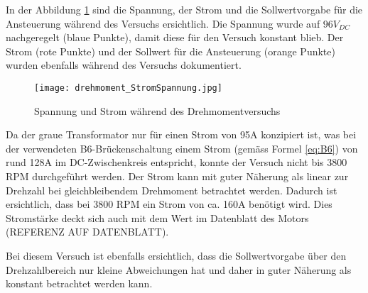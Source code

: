 In der Abbildung \ref{fig:drehmoment/StromSpannung} sind die Spannung, der Strom und die Sollwertvorgabe für die Ansteuerung während des Versuchs ersichtlich. Die Spannung wurde auf $96V_{DC}$ nachgeregelt (blaue Punkte), damit diese für den Versuch konstant blieb. Der Strom (rote Punkte) und der Sollwert für die Ansteuerung (orange Punkte) wurden ebenfalls während des Versuchs dokumentiert.


\begin{figure}[H]
	\centering
	\texttt{[image: drehmoment\_StromSpannung.jpg]}
	\caption{Spannung und Strom während des Drehmomentversuchs}\label{fig:drehmoment/StromSpannung}
\end{figure}

Da der graue Transformator nur für einen Strom von 95A konzipiert ist, was bei der verwendeten B6-Brückenschaltung einem Strom (gemäss Formel \ref{eq:B6}) von rund 128A im DC-Zwischenkreis entspricht, konnte der Versuch nicht bis 3800 RPM durchgeführt werden. Der Strom kann mit guter Näherung als linear zur Drehzahl bei gleichbleibendem Drehmoment betrachtet werden. Dadurch ist ersichtlich, dass bei 3800 RPM ein Strom von ca. 160A benötigt wird. Dies Stromstärke deckt sich auch mit dem Wert im Datenblatt des Motors (REFERENZ AUF DATENBLATT).

Bei diesem Versuch ist ebenfalls ersichtlich, dass die Sollwertvorgabe über den Drehzahlbereich nur kleine Abweichungen hat und daher in guter Näherung als konstant betrachtet werden kann.